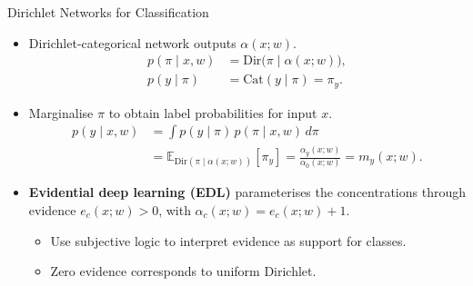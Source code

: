 \begin{frame}{Dirichlet Networks for Classification}
\label{frm:bg-dirichlet-network}
\setlength{\abovedisplayskip}{3pt}
\setlength{\belowdisplayskip}{3pt}
\begin{itemize}
\setlength{\itemsep}{4mm}
\item Dirichlet-categorical network outputs $\alpha(x;w)$. 
\begin{align*}
p(\pi\mid x,w)&=\mathrm{Dir}\bigl(\pi\mid\alpha(x;w)\bigr),\\
p(y\mid\pi)&=\mathrm{Cat}(y\mid\pi)=\pi_y.
\end{align*}
\item<2-> Marginalise $\pi$ to obtain label probabilities for input $x$.
\[
\begin{aligned}
p(y\mid x,w)
&=\int p(y\mid\pi)\,p(\pi\mid x,w)\,d\pi\\
&=\mathbb E_{\mathrm{Dir}(\pi\mid\alpha(x;w))}[\pi_y]
=\frac{\alpha_y(x;w)}{\alpha_0(x;w)}
=m_y(x;w).
\end{aligned}
\]
\item<3-> \textbf{Evidential deep learning (EDL)} parameterises the concentrations through evidence $e_c(x;w)>0$, with %
$\alpha_c(x;w)=e_c(x;w)+1$. %
\begin{itemize}
\item Use subjective logic to interpret evidence as support for classes.
\item Zero evidence corresponds to uniform Dirichlet.
\end{itemize}
\end{itemize}
\end{frame}

